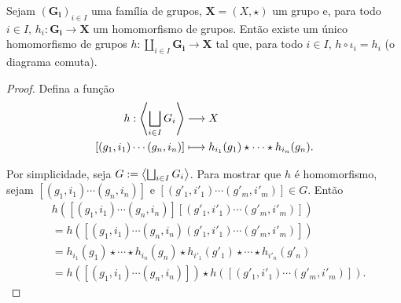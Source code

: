 \begin{prop}
Sejam $(\bm{G_i})_{i \in I}$ uma família de grupos, $\bm X = (X,\star)$ um grupo e, para todo $i \in I$, $h_i: \bm{G_i} \to \bm X$ um homomorfismo de grupos. Então existe um único homomorfismo de grupos $h: \coprod_{i \in I} \bm{G_i} \to \bm X$ tal que, para todo $i \in I$, $h \circ \iota_i = h_i$ (o diagrama comuta).
\begin{figure}
\centering
{}
\end{figure}
\end{prop}
\begin{proof}
Defina a função
	\begin{align*}
	{h}: {\left\langle \bigsqcup_{i \in I} G_i \right\rangle} &\longrightarrow {X} \\{\left[(g_1,i_1) \cdots (g_n,i_n)\right]} &\longmapsto {h_{i_1}(g_1) \star \cdots \star h_{i_n}(g_n)}.
	\end{align*}

Por simplicidade, seja $G := \left\langle \bigsqcup_{i \in I} G_i \right\rangle$. Para mostrar que $h$ é homomorfismo, sejam $[(g_1,i_1) \cdots (g_n,i_n)]$ e $[(g'_1,i'_1) \cdots (g'_m,i'_m)] \in G$. Então
	\begin{align*}
	&h([(g_1,i_1) \cdots (g_n,i_n)][(g'_1,i'_1) \cdots (g'_m,i'_m)]) \\
		&= h([(g_1,i_1) \cdots (g_n,i_n)(g'_1,i'_1) \cdots (g'_m,i'_m)]) \\
		&= h_{i_1}(g_1) \star \cdots \star h_{i_n}(g_n) \star h_{i'_1}(g'_1) \star \cdots \star h_{i'_n}(g'_n) \\
		&= h([(g_1,i_1) \cdots (g_n,i_n)]) \star h([(g'_1,i'_1) \cdots (g'_m,i'_m)]).
	\end{align*}
\end{proof}








































